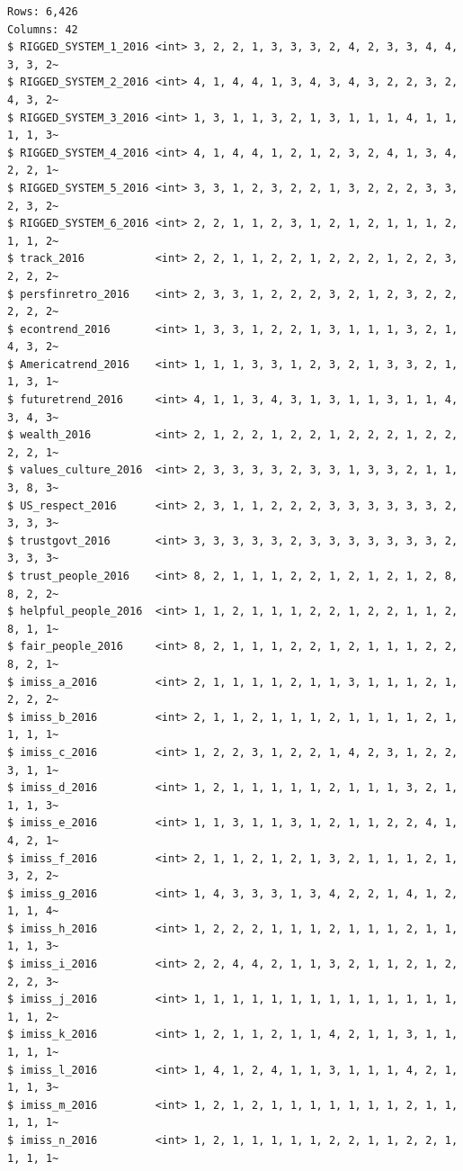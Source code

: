 \documentclass[
  letterpaper,
  DIV=11,
  numbers=noendperiod]{scrreprt}
\theoremstyle{definition}
\theoremstyle{remark}
\begin{document}
\begin{verbatim}
Rows: 6,426
Columns: 42
$ RIGGED_SYSTEM_1_2016 <int> 3, 2, 2, 1, 3, 3, 3, 2, 4, 2, 3, 3, 4, 4, 3, 3, 2~
$ RIGGED_SYSTEM_2_2016 <int> 4, 1, 4, 4, 1, 3, 4, 3, 4, 3, 2, 2, 3, 2, 4, 3, 2~
$ RIGGED_SYSTEM_3_2016 <int> 1, 3, 1, 1, 3, 2, 1, 3, 1, 1, 1, 4, 1, 1, 1, 1, 3~
$ RIGGED_SYSTEM_4_2016 <int> 4, 1, 4, 4, 1, 2, 1, 2, 3, 2, 4, 1, 3, 4, 2, 2, 1~
$ RIGGED_SYSTEM_5_2016 <int> 3, 3, 1, 2, 3, 2, 2, 1, 3, 2, 2, 2, 3, 3, 2, 3, 2~
$ RIGGED_SYSTEM_6_2016 <int> 2, 2, 1, 1, 2, 3, 1, 2, 1, 2, 1, 1, 1, 2, 1, 1, 2~
$ track_2016           <int> 2, 2, 1, 1, 2, 2, 1, 2, 2, 2, 1, 2, 2, 3, 2, 2, 2~
$ persfinretro_2016    <int> 2, 3, 3, 1, 2, 2, 2, 3, 2, 1, 2, 3, 2, 2, 2, 2, 2~
$ econtrend_2016       <int> 1, 3, 3, 1, 2, 2, 1, 3, 1, 1, 1, 3, 2, 1, 4, 3, 2~
$ Americatrend_2016    <int> 1, 1, 1, 3, 3, 1, 2, 3, 2, 1, 3, 3, 2, 1, 1, 3, 1~
$ futuretrend_2016     <int> 4, 1, 1, 3, 4, 3, 1, 3, 1, 1, 3, 1, 1, 4, 3, 4, 3~
$ wealth_2016          <int> 2, 1, 2, 2, 1, 2, 2, 1, 2, 2, 2, 1, 2, 2, 2, 2, 1~
$ values_culture_2016  <int> 2, 3, 3, 3, 3, 2, 3, 3, 1, 3, 3, 2, 1, 1, 3, 8, 3~
$ US_respect_2016      <int> 2, 3, 1, 1, 2, 2, 2, 3, 3, 3, 3, 3, 3, 2, 3, 3, 3~
$ trustgovt_2016       <int> 3, 3, 3, 3, 3, 2, 3, 3, 3, 3, 3, 3, 3, 2, 3, 3, 3~
$ trust_people_2016    <int> 8, 2, 1, 1, 1, 2, 2, 1, 2, 1, 2, 1, 2, 8, 8, 2, 2~
$ helpful_people_2016  <int> 1, 1, 2, 1, 1, 1, 2, 2, 1, 2, 2, 1, 1, 2, 8, 1, 1~
$ fair_people_2016     <int> 8, 2, 1, 1, 1, 2, 2, 1, 2, 1, 1, 1, 2, 2, 8, 2, 1~
$ imiss_a_2016         <int> 2, 1, 1, 1, 1, 2, 1, 1, 3, 1, 1, 1, 2, 1, 2, 2, 2~
$ imiss_b_2016         <int> 2, 1, 1, 2, 1, 1, 1, 2, 1, 1, 1, 1, 2, 1, 1, 1, 1~
$ imiss_c_2016         <int> 1, 2, 2, 3, 1, 2, 2, 1, 4, 2, 3, 1, 2, 2, 3, 1, 1~
$ imiss_d_2016         <int> 1, 2, 1, 1, 1, 1, 1, 2, 1, 1, 1, 3, 2, 1, 1, 1, 3~
$ imiss_e_2016         <int> 1, 1, 3, 1, 1, 3, 1, 2, 1, 1, 2, 2, 4, 1, 4, 2, 1~
$ imiss_f_2016         <int> 2, 1, 1, 2, 1, 2, 1, 3, 2, 1, 1, 1, 2, 1, 3, 2, 2~
$ imiss_g_2016         <int> 1, 4, 3, 3, 3, 1, 3, 4, 2, 2, 1, 4, 1, 2, 1, 1, 4~
$ imiss_h_2016         <int> 1, 2, 2, 2, 1, 1, 1, 2, 1, 1, 1, 2, 1, 1, 1, 1, 3~
$ imiss_i_2016         <int> 2, 2, 4, 4, 2, 1, 1, 3, 2, 1, 1, 2, 1, 2, 2, 2, 3~
$ imiss_j_2016         <int> 1, 1, 1, 1, 1, 1, 1, 1, 1, 1, 1, 1, 1, 1, 1, 1, 2~
$ imiss_k_2016         <int> 1, 2, 1, 1, 2, 1, 1, 4, 2, 1, 1, 3, 1, 1, 1, 1, 1~
$ imiss_l_2016         <int> 1, 4, 1, 2, 4, 1, 1, 3, 1, 1, 1, 4, 2, 1, 1, 1, 3~
$ imiss_m_2016         <int> 1, 2, 1, 2, 1, 1, 1, 1, 1, 1, 1, 2, 1, 1, 1, 1, 1~
$ imiss_n_2016         <int> 1, 2, 1, 1, 1, 1, 1, 2, 2, 1, 1, 2, 2, 1, 1, 1, 1~

\end{verbatim}
\end{document}
